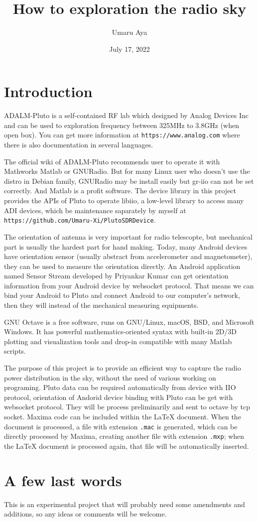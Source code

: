 \documentclass[a4paper,20pt]{article}
\title{How to exploration the radio sky}
\author{Umaru Aya}
\date{July 17, 2022}
\begin{document}
\maketitle

\clearpage

\section{Introduction}

ADALM-Pluto is a self-contained RF lab which designed by Analog Devices Inc and can be used to exploration frequency between 325MHz to 3.8GHz (when open box). You can get more information at \texttt{https://www.analog.com} where there is also documentation in several languages.

The official wiki of ADALM-Pluto recommends user to operate it with Mathworks Matlab or GNURadio. But for many Linux user who doesn't use the distro in Debian family, GNURadio may be install easily but gr-iio can not be set correctly. And Matlab is a profit software. The device library in this project provides the APIs of Pluto to operate libiio, a low-level library to access many ADI devices, which be maintenance saparately by myself at \texttt{https://github.com/Umaru-Xi/PlutoSDRDevice}.

The orientation of antenna is very important for radio telescopte, but mechanical part is usually the hardest part for hand making. Today, many Android devices have orientation sensor (usually abstract from accelerometer and magnetometer), they can be used to measure the orientation directly. An Android application named Sensor Stream developed by Priyankar Kumar can get orientation information from your Android device by websocket protocol. That means we can bind your Android to Pluto and connect Android to our computer's network, then they will instead of the mechanical measuring equipments.

GNU Octave is a free software, runs on GNU/Linux, macOS, BSD, and Microsoft Windows. It has powerful mathematics-oriented syntax with built-in 2D/3D plotting and visualization tools and drop-in compatible with many Matlab scripts.

The purpose of this project is to provide an efficient way to capture the radio power distribution in the sky, without the need of various working on programing. Pluto data can be required automatically from device with IIO protocol, orientation of Andorid device binding with Pluto can be get with websocket protocol. They will be process preliminarily and sent to octave by tcp socket.
Maxima code can be included within the
\LaTeX{} document. When the document is processed, a file with
extension \texttt{.mac} is generated, which can be directly processed
by Maxima, creating another file with extension \texttt{.mxp}; when
the \LaTeX{} document is processed again, that file will be
automatically inserted.


\section{A few last words}
This is an experimental project that will probably need some amendments and additions, so any ideas or comments will be welcome.
\\

\\
\\[10pt]
\end{document}
